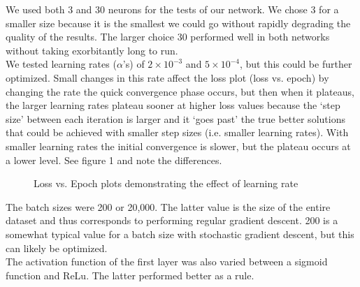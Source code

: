 \documentclass[reqno,14pt]{amsart}
\theoremstyle{plain}
\theoremstyle{definition}
\theoremstyle{remark}
\begin{document}
We used both 3 and 30 neurons for the tests of our network. We chose 3 for a smaller size because it is the smallest we could go without rapidly degrading the quality of the results. The larger choice 30 performed well in both networks without taking exorbitantly long to run.\\
We tested learning rates ($\alpha$'s) of $2 \times 10^{-3}$ and $5 \times 10^{-4}$, but this could be further optimized. Small changes in this rate affect the loss plot (loss vs. epoch) by changing the rate the quick convergence phase occurs, but then when it plateaus, the larger learning rates plateau sooner at higher loss values because the `step size' between each iteration is larger and it `goes past' the true better solutions that could be achieved with smaller step sizes (i.e. smaller learning rates). With smaller learning rates the initial convergence is slower, but the plateau occurs at a lower level. See figure 1 and note the differences.\\

\begin{figure}[!tbp]
  \centering
  \hfill
  \caption{Loss vs. Epoch plots demonstrating the effect of learning rate}
\end{figure}

The batch sizes were 200 or 20,000. The latter value is the size of the entire dataset and thus corresponds to performing regular gradient descent. 200 is a somewhat typical value for a batch size with stochastic gradient descent, but this can likely be optimized.\\
The activation function of the first layer was also varied between a sigmoid function and ReLu. The latter performed better as a rule.\\
\end{document}
